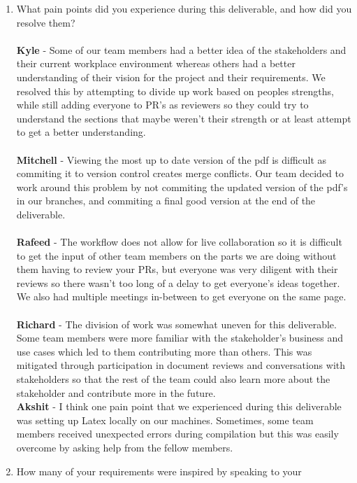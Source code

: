 \documentclass[12pt]{article}
\begin{document}
\begin{enumerate}
  \item What pain points did you experience during this deliverable, and how did
    you resolve them? \\
    \\
    \textbf{Kyle} - Some of our team members had a better idea of the
    stakeholders and their current workplace environment whereas
    others had a better understanding of their vision for the project
    and their requirements. We resolved this by attempting to divide
    up work based on peoples strengths, while still adding everyone
    to PR's as reviewers so they could try to understand the sections
    that maybe weren't their strength or at least attempt to get a
    better understanding.\\
    \\
    \textbf{Mitchell} - Viewing the most up to date version of the
    pdf is difficult as commiting it to version control creates merge
    conflicts. Our team decided to work around this problem by not
    commiting the updated version of the pdf's in our branches, and
    commiting a final good version at the end of the deliverable.\\
    \\
    \textbf{Rafeed} - The workflow does not allow for live
    collaboration so it is difficult to get the input of other team
    members on the parts we are doing without them having to review
    your PRs, but everyone was very diligent with their reviews so
    there wasn't too long of a delay to get everyone's ideas
    together. We also had multiple meetings in-between to get
    everyone on the same page.\\
    \\
    \textbf{Richard} - The division of work was somewhat uneven for this
    deliverable. Some team members were more familiar with the stakeholder's
    business and use cases which led to them contributing more than others.
    This was mitigated through participation in document reviews and
    conversations with stakeholders so that the rest of the team could also
    learn more about the stakeholder and contribute more in the future.
    \\
    \textbf{Akshit} - I think one pain point that we experienced during this
    deliverable was setting up Latex locally on our machines.
    Sometimes, some team
    members received unexpected errors during compilation but this
    was easily overcome
    by asking help from the fellow members.\\
  \item How many of your requirements were inspired by speaking to your

\end{enumerate}
\end{document}
